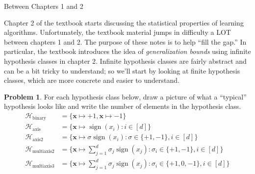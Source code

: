 \documentclass[10pt]{exam}
\theoremstyle{definition}
\newtheorem{problem}{Problem}
\DeclareMathOperator{\sign}{sign}
\newcommand{\x}{\mathbf x}
\newcommand{\lone}[1]{{\lVert {#1} \rVert}_1}
\newcommand{\ltwo}[1]{{\lVert {#1} \rVert}_2}
\newcommand{\lp}[1]{{\lVert {#1} \rVert}_p}
\newcommand{\HH}[1]{\mathcal H_{\text{#1}}}
\begin{document}
\begin{center}
{
\Huge
Between Chapters 1 and 2
}
\end{center}

\begin{center}
\end{center}

\noindent
Chapter 2 of the textbook starts discussing the statistical properties of learning algorithms.
Unfortunately, the textbook material jumps in difficulty a LOT between chapters 1 and 2.
The purpose of these notes is to help ``fill the gap.''
In particular, the textbook introduces the idea of \emph{generalization bounds} using infinite hypothesis classes in chapter 2.
Infinite hypothesis classes are fairly abstract and can be a bit tricky to understand;
so we'll start by looking at finite hypothesis classes,
which are more concrete and easier to understand.



\begin{problem}
    For each hypothesis class below, draw a picture of what a ``typical'' hypothesis looks like and write the number of elements in the hypothesis class.
\begin{align*}
    \HH{binary} &= \bigg\{ \x \mapsto +1, \x \mapsto -1 \bigg\}\\
    \HH{axis} &= \bigg\{ \x \mapsto \sign(x_i) : i \in [d] \bigg\} \\
    \HH{axis2} &= \bigg\{ \x \mapsto \sigma\sign(x_i) : \sigma \in\{+1, -1\}, i \in [d] \bigg\} \\
    \HH{multiaxis2} &= \bigg\{ \x \mapsto \sum_{j=1}^d \sigma_j \sign(x_j) : \sigma_i \in \{+1, -1\}, i \in [d] \bigg\}  \\
    \HH{multiaxis3} &= \bigg\{ \x \mapsto \sum_{j=1}^d \sigma_j \sign(x_j) : \sigma_i \in \{+1, 0, -1\}, i \in [d] \bigg\}  \\
\end{align*}
\end{problem}
\end{document}
